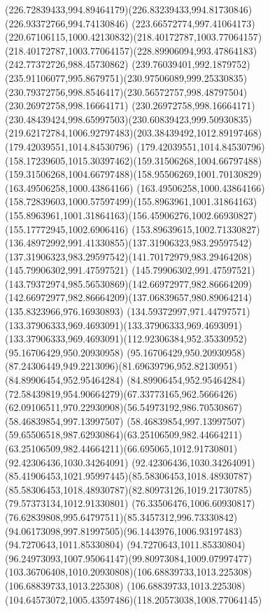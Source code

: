 {{	\curveto(226.72839433,994.89464179)(226.83239433,994.81730846)(226.93372766,994.74130846)
	\curveto(223.66572774,997.41064173)(220.67106115,1000.42130832)(218.40172787,1003.77064157)
	\curveto(218.40172787,1003.77064157)(228.89906094,993.47864183)(242.77372726,988.45730862)
	\curveto(239.76039401,992.1879752)(235.91106077,995.8679751)(230.97506089,999.25330835)
	\curveto(230.79372756,998.8546417)(230.56572757,998.48797504)(230.26972758,998.16664171)
	\curveto(230.26972758,998.16664171)(230.48439424,998.65997503)(230.60839423,999.50930835)
	\curveto(219.62172784,1006.92797483)(203.38439492,1012.89197468)(179.42039551,1014.84530796)
	\curveto(179.42039551,1014.84530796)(158.17239605,1015.30397462)(159.31506268,1004.66797488)
	\curveto(159.31506268,1004.66797488)(158.95506269,1001.70130829)(163.49506258,1000.43864166)
	\curveto(163.49506258,1000.43864166)(158.72839603,1000.57597499)(155.8963961,1001.31864163)
	\curveto(155.8963961,1001.31864163)(156.45906276,1002.66930827)(155.17772945,1002.6906416)
	\curveto(153.89639615,1002.71330827)(136.48972992,991.41330855)(137.31906323,983.29597542)
	\curveto(137.31906323,983.29597542)(141.70172979,983.29464208)(145.79906302,991.47597521)
	\curveto(145.79906302,991.47597521)(143.79372974,985.56530869)(142.66972977,982.86664209)
	\curveto(142.66972977,982.86664209)(137.06839657,980.89064214)(135.8323966,976.16930893)
	\curveto(134.59372997,971.44797571)(133.37906333,969.4693091)(133.37906333,969.4693091)
	\curveto(133.37906333,969.4693091)(112.92306384,952.35330952)(95.16706429,950.20930958)
	\curveto(95.16706429,950.20930958)(87.24306449,949.2213096)(81.69639796,952.82130951)
	\lineto(84.89906454,952.95464284)
	\curveto(84.89906454,952.95464284)(72.58439819,954.90664279)(67.33773165,962.5666426)
	\curveto(62.09106511,970.22930908)(56.54973192,986.70530867)(58.46839854,997.13997507)
	\curveto(58.46839854,997.13997507)(59.65506518,987.62930864)(63.25106509,982.44664211)
	\curveto(63.25106509,982.44664211)(66.695065,1012.91730801)(92.42306436,1030.34264091)
	\curveto(92.42306436,1030.34264091)(85.41906453,1021.95997445)(85.58306453,1018.48930787)
	\curveto(85.58306453,1018.48930787)(82.80973126,1019.21730785)(79.57373134,1012.91330801)
	\curveto(76.33506476,1006.60930817)(76.62839808,995.64797511)(85.3457312,996.73330842)
	\curveto(94.06173098,997.81997505)(96.1443976,1006.93197483)(94.7270643,1011.85330804)
	\curveto(94.7270643,1011.85330804)(96.24973093,1007.95064147)(99.80973084,1009.07997477)
	\curveto(103.36706408,1010.20930808)(106.68839733,1013.225308)(106.68839733,1013.225308)
	\curveto(106.68839733,1013.225308)(104.64573072,1005.43597486)(118.20573038,1008.77064145)
}}

